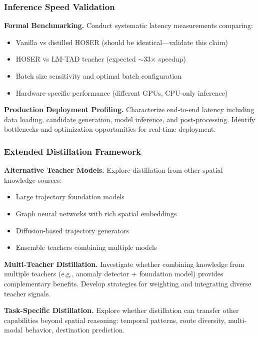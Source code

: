 \subsubsection{Inference Speed Validation}

\textbf{Formal Benchmarking.} Conduct systematic latency measurements comparing:
\begin{itemize}[noitemsep,topsep=0pt]
\item Vanilla vs distilled HOSER (should be identical—validate this claim)
\item HOSER vs LM-TAD teacher (expected $\sim$33$\times$ speedup)
\item Batch size sensitivity and optimal batch configuration
\item Hardware-specific performance (different GPUs, CPU-only inference)
\end{itemize}

\textbf{Production Deployment Profiling.} Characterize end-to-end latency including data loading, candidate generation, model inference, and post-processing. Identify bottlenecks and optimization opportunities for real-time deployment.

\subsubsection{Extended Distillation Framework}

\textbf{Alternative Teacher Models.} Explore distillation from other spatial knowledge sources:
\begin{itemize}[noitemsep,topsep=0pt]
\item Large trajectory foundation models~\cite{maLearningUniversalHuman2025}
\item Graph neural networks with rich spatial embeddings
\item Diffusion-based trajectory generators~\cite{chuSimulatingHumanMobility2024}
\item Ensemble teachers combining multiple models
\end{itemize}

\textbf{Multi-Teacher Distillation.} Investigate whether combining knowledge from multiple teachers (e.g., anomaly detector + foundation model) provides complementary benefits. Develop strategies for weighting and integrating diverse teacher signals.

\textbf{Task-Specific Distillation.} Explore whether distillation can transfer other capabilities beyond spatial reasoning: temporal patterns, route diversity, multi-modal behavior, destination prediction.

